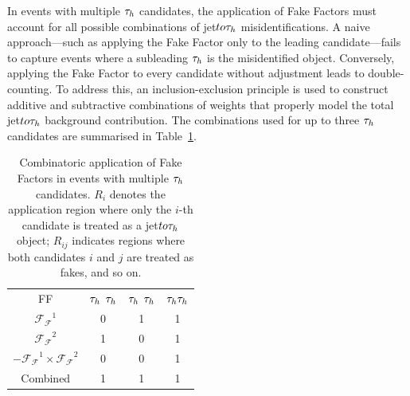In events with multiple $\PGt_h$ candidates, the application of Fake Factors must account for all possible combinations of jet$to\tau_h$ misidentifications. A naive approach—such as applying the Fake Factor only to the leading candidate—fails to capture events where a subleading $\PGt_h$ is the misidentified object. Conversely, applying the Fake Factor to every candidate without adjustment leads to double-counting. To address this, an inclusion-exclusion principle is used to construct additive and subtractive combinations of weights that properly model the total jet$to\tau_h$ background contribution. The combinations used for up to three $\PGt_h$ candidates are summarised in Table~\ref{Table:FFApplication}.

\begin{table}[h]
\centering
\begin{tabular}{cccc}
\toprule
FF & $\PGt_h$ \textcolor{red}{$\PGt_h$} & \textcolor{red}{$\PGt_h$} $\PGt_h$ & \textcolor{red}{$\tau_h \tau_h$} \\

$\mathcal{F_F}^1$ & 0 & 1 & 1 \\
$\mathcal{F_F}^2$ & 1 & 0 & 1 \\
$-\mathcal{F_F}^1 \times \mathcal{F_F}^2$ & 0 & 0 & 1 \\
\bottomrule
Combined & 1 & 1 & 1 \\
\end{tabular}
\caption[Combinatoric application of Fake Factors for multiple $\PGt_h$ candidates.]{Combinatoric application of Fake Factors in events with multiple $\PGt_h$ candidates. $R_i$ denotes the application region where only the $i$-th candidate is treated as a jet$to\tau_h$ object; $R_{ij}$ indicates regions where both candidates $i$ and $j$ are treated as fakes, and so on.}
\label{Table:FFApplication}
\end{table}


